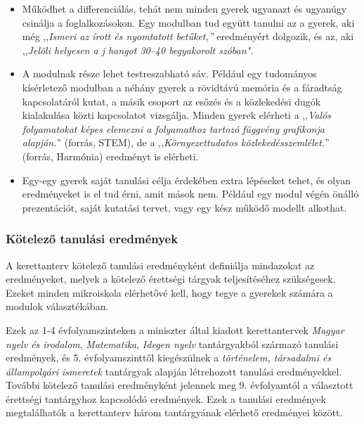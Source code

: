 \begin{itemize}
      \item
            Működhet a differenciálás, tehát nem minden gyerek ugyanazt és
            ugyanúgy csinálja a foglalkozásokon. Egy modulban tud
            együtt	tanulni az a gyerek, aki még ,,\emph{Ismeri az
                  írott és nyomtatott  betűket,''} eredményért dolgozik,
            és az, aki ,,\emph{Jelöli helyesen a j	hangot 30--40
                  begyakorolt szóban".}
      \item
            A modulnak része lehet testreszabható sáv. Például egy tudományos
            kísérletező modulban a néhány gyerek a rövidtávú
            memória és a	fáradtság kapcsolatáról kutat, a másik
            csoport az esőzés és a	közlekedési dugók kialakulása
            közti kapcsolatot vizsgálja. Minden  gyerek elérheti a
            ,,\emph{Valós folyamatokat képes elemezni a folyamathoz
                  tartozó függvény grafikonja alapján.}'' (forrás, STEM), de a
            ,,\emph{Környezettudatos közlekedésszemlélet.}''
            (forrás, Harmónia)	eredményt is elérheti.
      \item
            Egy-egy gyerek saját tanulási célja érdekében extra lépéseket
            tehet, és olyan eredményeket is el tud érni, amit mások
            nem.	Például egy modul végén önálló prezentációt, saját
            kutatási  tervet, vagy egy kész működő modellt alkothat.
\end{itemize}

\subsubsection{Kötelező tanulási eredmények}
\label{sec:kotelezo_tanulasi_eredmenyek}
A kerettanterv kötelező tanulási eredményként definiálja mindazokat az
eredményeket, melyek a kötelező érettségi tárgyak teljesítéséhez
szükségesek. Ezeket minden mikroiskola elérhetővé kell, hogy tegye a
gyerekek számára a modulok választékában.

Ezek az 1-4 évfolyamszinteken a miniszter által kiadott kerettantervek
\emph{Magyar nyelv és irodalom}, \emph{Matematika}, \emph{Idegen nyelv}
tantárgyakból
származó tanulási eredmények, és 5. évfolyamszinttől kiegészülnek a
\emph{történelem, társadalmi és állampolgári ismeretek} tantárgyak alapján
létrehozott tanulási eredményekkel. További kötelező tanulási
eredményként jelennek meg 9. évfolyamtól a választott érettségi
tantárgyhoz kapcsolódó eredmények. Ezek a tanulási eredmények
megtalálhatók a kerettanterv három tantárgyának elérhető eredményei
között.

